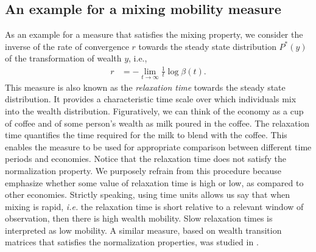 \documentclass[11pt]{article}
\newcommand{\ie}{{\it i.e.}\xspace}
\numberwithin{equation}{section}
\begin{document}
\subsection{An example for a mixing mobility measure}
\label{sec:relaxation-time}
As an example for a measure that satisfies the mixing property, we consider the inverse of the rate of convergence $r$ towards the steady state distribution $P^*(y)$ of the transformation of wealth $y$, i.e.,
\begin{align}
    r &= - \lim_{t \to \infty} \frac{1}{t} \log \beta(t).
\end{align}
This measure is also known as the \textit{relaxation time} towards the steady state distribution. It provides a characteristic time scale over which individuals mix into the wealth distribution. Figuratively, we can think of the economy as a cup of coffee and of some person's wealth as milk poured in the coffee. The relaxation time quantifies the time required for the milk to blend with the coffee. This enables the measure to be used for appropriate comparison between different time periods and economies. Notice that the relaxation time does not satisfy the normalization property. We purposely refrain from this procedure because emphasize whether some value of relaxation time is high or low, as compared to other economies. Strictly speaking, using time units allows us say that when mixing is rapid, \ie the relaxation time is short relative to a relevant window of observation, then there is high wealth mobility. Slow relaxation times is interpreted as low mobility. A similar measure, based on wealth transition matrices that satisfies the normalization properties, was studied in \citep{Shorrocks1978}.
\end{document}
